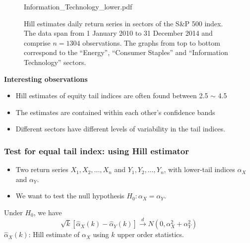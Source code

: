 \documentclass{beamer}
\begin{document}
\begin{frame}
\begin{minipage}[t]{0.5\linewidth}
\begin{figure}[htb!]
\begin{minipage}{1.0\linewidth}
                        {Information_Technology_lower.pdf}
      \end{minipage}
      \caption{\tiny Hill estimates daily return series in
        sectors of the S\&P 500 index. The data span  from 1 January
        2010 to 31 December 2014 and comprise $n=1304$ observations.
        The graphs from top to bottom correspond to the ``Energy'',
        ``Consumer Staples'' and ``Information Technology'' sectors.
      }\label{fig:1}
    \end{figure}
  \end{minipage}\hfill
  \begin{minipage}[t]{0.5\linewidth}
    \textcolor[HTML]{990033}{\bf Interesting observations}
    \begin{itemize}
      \item Hill estimates of equity tail indices are often found
        between 2.5 $\sim$ 4.5
      \item The estimates are contained within each other's confidence bands
      \item Different sectors have different levels of variability in
        the tail indices.
    \end{itemize}
  \end{minipage}
\end{frame}

\begin{frame}
  \frametitle{Test for equal tail index: using Hill estimator}
  \begin{itemize}
    \item   Two return series $X_1, X_2, \dots, X_n$ and
      $Y_1, Y_2, \dots, Y_n$, with lower-tail indices
      $\alpha_X$ and $\alpha_Y$.
    \item We want to test the null hypothesis $H_0: \alpha_X = \alpha_Y$.
  \end{itemize}
  Under $H_0$, we have
  \[
  \sqrt k [\hat \alpha_X(k) - \hat \alpha_Y(k)] \overset{d}{\to}
  N(0, \alpha_X^2 + \alpha_Y^2)
  \]
  $\hat \alpha_X(k)$: Hill estimate of $\alpha_X$ using $k$ upper
  order statistics.
\end{frame}
\end{document}
